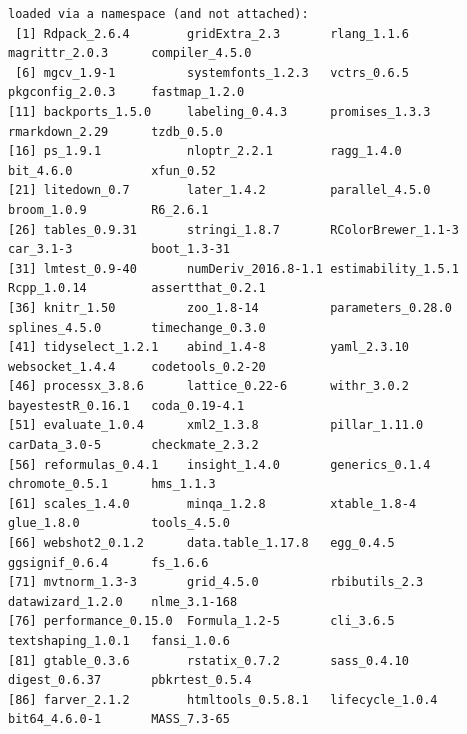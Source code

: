 \documentclass[
  11pt,
  oneside]{article}
\begin{document}
\begin{verbatim}
loaded via a namespace (and not attached):
 [1] Rdpack_2.6.4        gridExtra_2.3       rlang_1.1.6         magrittr_2.0.3      compiler_4.5.0     
 [6] mgcv_1.9-1          systemfonts_1.2.3   vctrs_0.6.5         pkgconfig_2.0.3     fastmap_1.2.0      
[11] backports_1.5.0     labeling_0.4.3      promises_1.3.3      rmarkdown_2.29      tzdb_0.5.0         
[16] ps_1.9.1            nloptr_2.2.1        ragg_1.4.0          bit_4.6.0           xfun_0.52          
[21] litedown_0.7        later_1.4.2         parallel_4.5.0      broom_1.0.9         R6_2.6.1           
[26] tables_0.9.31       stringi_1.8.7       RColorBrewer_1.1-3  car_3.1-3           boot_1.3-31        
[31] lmtest_0.9-40       numDeriv_2016.8-1.1 estimability_1.5.1  Rcpp_1.0.14         assertthat_0.2.1   
[36] knitr_1.50          zoo_1.8-14          parameters_0.28.0   splines_4.5.0       timechange_0.3.0   
[41] tidyselect_1.2.1    abind_1.4-8         yaml_2.3.10         websocket_1.4.4     codetools_0.2-20   
[46] processx_3.8.6      lattice_0.22-6      withr_3.0.2         bayestestR_0.16.1   coda_0.19-4.1      
[51] evaluate_1.0.4      xml2_1.3.8          pillar_1.11.0       carData_3.0-5       checkmate_2.3.2    
[56] reformulas_0.4.1    insight_1.4.0       generics_0.1.4      chromote_0.5.1      hms_1.1.3          
[61] scales_1.4.0        minqa_1.2.8         xtable_1.8-4        glue_1.8.0          tools_4.5.0        
[66] webshot2_0.1.2      data.table_1.17.8   egg_0.4.5           ggsignif_0.6.4      fs_1.6.6           
[71] mvtnorm_1.3-3       grid_4.5.0          rbibutils_2.3       datawizard_1.2.0    nlme_3.1-168       
[76] performance_0.15.0  Formula_1.2-5       cli_3.6.5           textshaping_1.0.1   fansi_1.0.6        
[81] gtable_0.3.6        rstatix_0.7.2       sass_0.4.10         digest_0.6.37       pbkrtest_0.5.4     
[86] farver_2.1.2        htmltools_0.5.8.1   lifecycle_1.0.4     bit64_4.6.0-1       MASS_7.3-65        
\end{verbatim}
\end{document}
